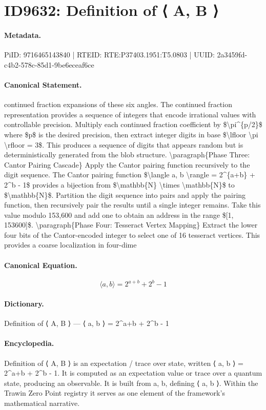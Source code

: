 \section*{ID9632: Definition of ⟨ A, B ⟩}
\paragraph{Metadata.}
PiID: 9716465143840 | RTEID: RTE:P37403.1951:T5.0803 | UUID: 2a3459fd-c4b2-578c-85d1-9be6eceaf6ce

\paragraph{Canonical Statement.}
continued fraction expansions of these six angles. The continued fraction representation provides a sequence of integers that encode irrational values with controllable precision. Multiply each continued fraction coefficient by \$\textbackslash{}pi\textasciicircum{}\{p/2\}\$ where \$p\$ is the desired precision, then extract integer digits in base \$\textbackslash{}lfloor \textbackslash{}pi \textbackslash{}rfloor = 3\$. This produces a sequence of digits that appears random but is deterministically generated from the blob structure. \textbackslash{}paragraph\{Phase Three: Cantor Pairing Cascade\} Apply the Cantor pairing function recursively to the digit sequence. The Cantor pairing function \$\textbackslash{}langle a, b \textbackslash{}rangle = 2\textasciicircum{}\{a+b\} + 2\textasciicircum{}b - 1\$ provides a bijection from \$\textbackslash{}mathbb\{N\} \textbackslash{}times \textbackslash{}mathbb\{N\}\$ to \$\textbackslash{}mathbb\{N\}\$. Partition the digit sequence into pairs and apply the pairing function, then recursively pair the results until a single integer remains. Take this value modulo 153,600 and add one to obtain an address in the range \$[1, 153600]\$. \textbackslash{}paragraph\{Phase Four: Tesseract Vertex Mapping\} Extract the lower four bits of the Cantor-encoded integer to select one of 16 tesseract vertices. This provides a coarse localization in four-dime

\paragraph{Canonical Equation.}
\[
\langle a, b \rangle = 2^{a+b} + 2^b - 1
\]

\paragraph{Dictionary.}
Definition of ⟨ A, B ⟩ — ⟨ a, b ⟩ = 2\textasciicircum{}a+b + 2\textasciicircum{}b - 1

\paragraph{Encyclopedia.}
Definition of ⟨ A, B ⟩ is an expectation / trace over state, written ⟨ a, b ⟩ = 2\textasciicircum{}a+b + 2\textasciicircum{}b - 1. It is computed as an expectation value or trace over a quantum state, producing an observable. It is built from a, b, defining ⟨ a, b ⟩. Within the Trawin Zero Point registry it serves as one element of the framework's mathematical narrative.
